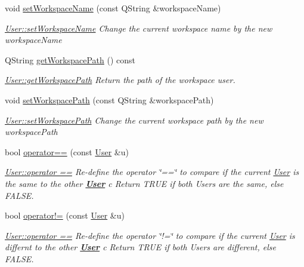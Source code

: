 \begin{DoxyCompactItemize}
void \hyperlink{classModels_1_1User_ae51aa34e41159fe7e4541a8cfddc50a3}{set\-Workspace\-Name} (const Q\-String \&workspace\-Name)
\begin{DoxyCompactList}\small\item\em \hyperlink{classModels_1_1User_ae51aa34e41159fe7e4541a8cfddc50a3}{User\-::set\-Workspace\-Name} Change the current workspace name by the new {\itshape workspace\-Name} \end{DoxyCompactList}\item 
Q\-String \hyperlink{classModels_1_1User_aa9421bda240316f9eebd0145f6dc3eda}{get\-Workspace\-Path} () const 
\begin{DoxyCompactList}\small\item\em \hyperlink{classModels_1_1User_aa9421bda240316f9eebd0145f6dc3eda}{User\-::get\-Workspace\-Path} Return the path of the workspace user. \end{DoxyCompactList}\item 
void \hyperlink{classModels_1_1User_ae62b6cc7c6c5f5ab80b9f066b67afc95}{set\-Workspace\-Path} (const Q\-String \&workspace\-Path)
\begin{DoxyCompactList}\small\item\em \hyperlink{classModels_1_1User_ae62b6cc7c6c5f5ab80b9f066b67afc95}{User\-::set\-Workspace\-Path} Change the current workspace path by the new {\itshape workspace\-Path} \end{DoxyCompactList}\item 
bool \hyperlink{classModels_1_1User_a60d18c2d1df053f1abf1215414f0b4b6}{operator==} (const \hyperlink{classModels_1_1User}{User} \&u)
\begin{DoxyCompactList}\small\item\em \hyperlink{classModels_1_1User_a60d18c2d1df053f1abf1215414f0b4b6}{User\-::operator ==} Re-\/define the operator \char`\"{}==\char`\"{} to compare if the current \hyperlink{classModels_1_1User}{User} is the same to the other {\bfseries \hyperlink{classModels_1_1User}{User}} {\itshape c} Return T\-R\-U\-E if both Users are the same, else F\-A\-L\-S\-E. \end{DoxyCompactList}\item 
bool \hyperlink{classModels_1_1User_aa1cdb1f752173aedd5f0c43edcb0b10b}{operator!=} (const \hyperlink{classModels_1_1User}{User} \&u)
\begin{DoxyCompactList}\small\item\em \hyperlink{classModels_1_1User_a60d18c2d1df053f1abf1215414f0b4b6}{User\-::operator ==} Re-\/define the operator \char`\"{}!=\char`\"{} to compare if the current \hyperlink{classModels_1_1User}{User} is differnt to the other {\bfseries \hyperlink{classModels_1_1User}{User}} {\itshape c} Return T\-R\-U\-E if both Users are different, else F\-A\-L\-S\-E. \end{DoxyCompactList}\end{DoxyCompactItemize}
